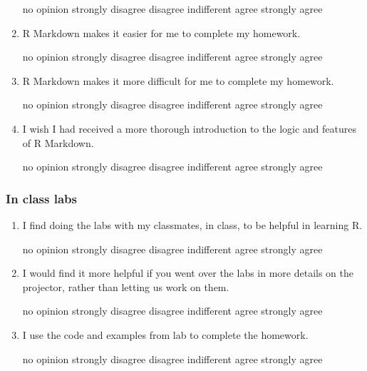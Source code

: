 \documentclass[10pt]{article}
\begin{document}
\begin{enumerate}
\begin{center}
		no opinion \qquad strongly disagree \qquad disagree \qquad indifferent \qquad agree \qquad strongly agree
	\end{center}
	\item R Markdown makes it easier for me to complete my homework.
	\begin{center}
		no opinion \qquad strongly disagree \qquad disagree \qquad indifferent \qquad agree \qquad strongly agree
	\end{center}
	\item R Markdown makes it more difficult for me to complete my homework.
	\begin{center}
		no opinion \qquad strongly disagree \qquad disagree \qquad indifferent \qquad agree \qquad strongly agree
	\end{center}
	\item I wish I had received a more thorough introduction to the logic and features of R Markdown.
	\begin{center}
		no opinion \qquad strongly disagree \qquad disagree \qquad indifferent \qquad agree \qquad strongly agree
	\end{center}
\end{enumerate}

\subsubsection*{In class labs}
\begin{enumerate}
	\item I find doing the labs with my classmates, in class, to be helpful in learning R.
	\begin{center}
		no opinion \qquad strongly disagree \qquad disagree \qquad indifferent \qquad agree \qquad strongly agree
	\end{center}
	\item I would find it more helpful if you went over the labs in more details on the projector, rather than letting us work on them.
	\begin{center}
		no opinion \qquad strongly disagree \qquad disagree \qquad indifferent \qquad agree \qquad strongly agree
	\end{center}
	\item I use the code and examples from lab to complete the homework.
	\begin{center}
		no opinion \qquad strongly disagree \qquad disagree \qquad indifferent \qquad agree \qquad strongly agree
	\end{center}
\end{enumerate}
\end{document}
